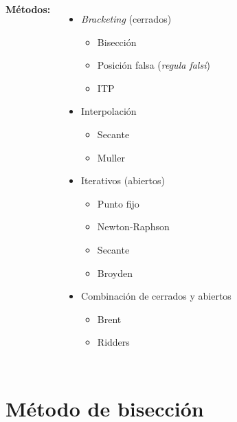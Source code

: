 \documentclass[9pt, aspectratio=169]{beamer}
\begin{document}
\begin{frame}
\begin{columns}[t]
		\cx
		\textbf{Métodos:}  %
		\begin{itemize}
			\item \textit{Bracketing} (cerrados)
			      \begin{itemize}
				      \item \alert{Bisección}
				      \item Posición falsa (\textit{regula falsi})
				      \item ITP
			      \end{itemize}
			\item Interpolación
			      \begin{itemize}
				      \item Secante
				      \item Muller
			      \end{itemize}
			\item Iterativos (abiertos)
			      \begin{itemize}
				      \item \alert{Punto fijo}
				      \item \alert{Newton-Raphson}
				      \item Secante
				      \item Broyden
			      \end{itemize}
			\item Combinación de cerrados y abiertos
			      \begin{itemize}
				      \item {\color{blue} Brent}
				      \item Ridders
			      \end{itemize}
		\end{itemize}
	\end{columns}
\end{frame}

\section{Método de bisección}
\end{document}
